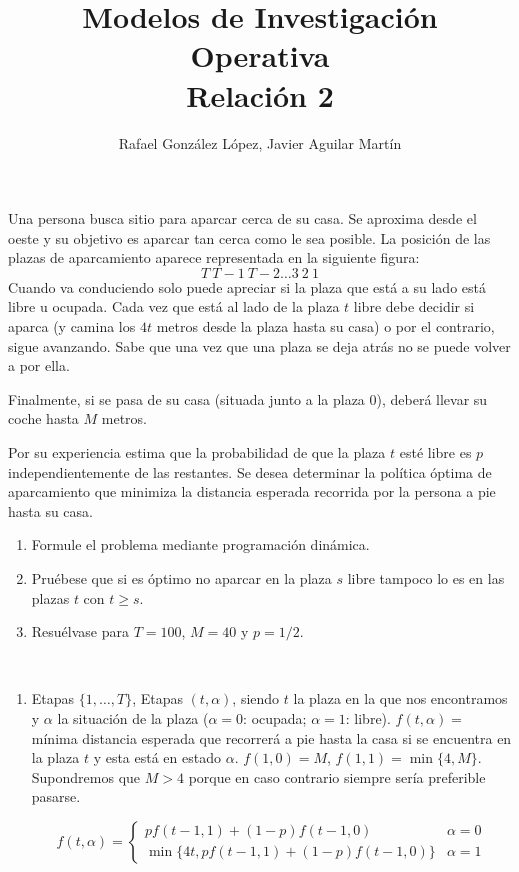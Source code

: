 \documentclass[twoside]{article}
\begin{document}
\title{Modelos de Investigación Operativa\\ Relación 2}
\author{Rafael González López, Javier Aguilar Martín}
\date{}
\maketitle

\begin{ejercicio}{1}
Una persona busca sitio para aparcar cerca de su casa. Se aproxima desde el oeste y su objetivo es aparcar tan cerca como le sea posible. La posición de las plazas de aparcamiento aparece representada en la siguiente figura:
$$T\ T-1\ T-2\dots 3\ 2\ 1$$
Cuando va conduciendo solo puede apreciar si la plaza que está a su lado está libre u ocupada. Cada vez que está al lado de la plaza $t$ libre debe decidir si aparca (y camina los $4t$ metros desde la plaza hasta su casa) o por el contrario, sigue avanzando. Sabe que una vez que una plaza se deja atrás no se puede volver a por ella. 

Finalmente, si se pasa de su casa (situada junto a la plaza 0), deberá llevar su coche hasta $M$ metros.

Por su experiencia estima que la probabilidad de que la plaza $t$ esté libre es $p$ independientemente de las restantes. Se desea determinar la política óptima de aparcamiento que minimiza la distancia esperada recorrida por la persona a pie hasta su casa.
\begin{enumerate}
\item Formule el problema mediante programación dinámica.
\item Pruébese que si es óptimo no aparcar en la plaza $s$ libre tampoco lo es en las plazas $t$ con $t\geq s$.
\item Resuélvase para $T=100$, $M=40$ y $p=1/2$.
\end{enumerate}
\newpage
\begin{solucion}\
\begin{enumerate}

\item Etapas $\{1,\dots, T\}$, Etapas $(t,\alpha)$, siendo $t$ la plaza en la que nos encontramos y $\alpha$ la situación de la plaza ($\alpha=0$: ocupada; $\alpha=1$: libre). $f(t,\alpha)=$ mínima distancia esperada que recorrerá a pie hasta la casa si se encuentra en la plaza $t$ y esta está en estado $\alpha$. $f(1,0)=M$, $f(1,1)=\min\{4,M\}$. Supondremos que $M>4$ porque en caso contrario siempre sería preferible pasarse.

$$f(t,\alpha)=\begin{cases}
 pf(t-1,1)+(1-p)f(t-1,0)& \alpha=0\\
 \min\{4t,pf(t-1,1)+(1-p)f(t-1,0)\} & \alpha=1
\end{cases}$$


\end{enumerate}
\end{solucion}
\end{ejercicio}
\end{document}
